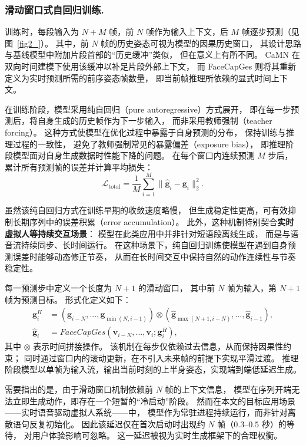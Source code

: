 \subsubsection{滑动窗口式自回归训练.}

训练时，每段输入为 $N+M$ 帧，前 $N$ 帧作为输入上下文，后 $M$ 帧逐步预测（见图~\ref{fig2_}）。
其中，前 $N$ 帧的历史姿态可视为模型的因果历史窗口，
其设计思路与基线模型中附加片段首部的“历史缓冲”类似，
但在意义上有所不同。
CaMN 在双向时间建模下使用该缓冲以补足片段外部上下文，
而 FaceCapGes 则将其重新定义为实时预测所需的前序姿态帧数量，
即当前帧推理所依赖的显式时间上下文。

在训练阶段，模型采用纯自回归（pure autoregressive）方式展开，
即在每一步预测后，将自身生成的历史帧作为下一步输入，
而非采用教师强制（teacher forcing）。
这种方式使模型在优化过程中暴露于自身预测的分布，
保持训练与推理过程的一致性，
避免了教师强制常见的暴露偏差（exposure bias），
即推理阶段模型面对自身生成数据时性能下降的问题。
在每个窗口内连续预测 $M$ 步后，
累计所有预测帧的误差并计算平均损失：
\begin{equation}
\mathcal{L}_{\text{total}} = \frac{1}{M}\sum_{i=1}^{M} \|\hat{\bm{g}}_i - \bm{g}_i\|_2^2.
\end{equation}

虽然该纯自回归方式在训练早期的收敛速度略慢，
但生成稳定性更高，可有效抑制长期序列中的误差积累（error accumulation）。
此外，这种机制特别契合\textbf{实时虚拟人等持续交互场景}：
模型在此类应用中并非针对短语段离线生成，
而是与语音流持续同步、长时间运行。
在这种场景下，纯自回归训练使模型在遇到自身预测误差时能够动态修正节奏，
从而在长时间交互中保持自然的动作连续性与节奏稳定性。

每一预测步中定义一个长度为 $N+1$ 的滑动窗口，
其中前 $N$ 帧为输入，第 $N+1$ 帧为预测目标。
形式化定义如下：
\begin{align}
\bm{g}^H_i &= (\bm{g}_{i-N}, ..., \bm{g}_{\min(N, i-1)}) \otimes (\hat{\bm{g}}_{\max(N+1, i-N)}, ..., \hat{\bm{g}}_{i-1}), \\
\hat{\bm{g}}_i &= FaceCapGes(\bm{v}_{i-N}, ..., \bm{v}_i; \bm{g}^H_i),
\end{align}
其中 $\otimes$ 表示时间拼接操作。
该机制在每步仅依赖过去信息，从而保持因果性约束；
同时通过窗口内的滚动更新，在不引入未来帧的前提下实现平滑过渡。
推理阶段模型以单帧为输入流，输出当前时刻的上半身姿态，实现端到端低延迟生成。

需要指出的是，由于滑动窗口机制依赖前 $N$ 帧的上下文信息，
模型在序列开端无法立即生成动作，即存在一个短暂的“冷启动”阶段。
然而在本文的目标应用场景——实时语音驱动虚拟人系统——中，
模型作为常驻进程持续运行，而非针对离散语句反复初始化。
因此该延迟仅在首次启动时出现约 $N$ 帧（$0.3$--$0.5$ 秒）的等待，
对用户体验影响可忽略。
这一延迟被视为实时生成框架下的合理权衡。

